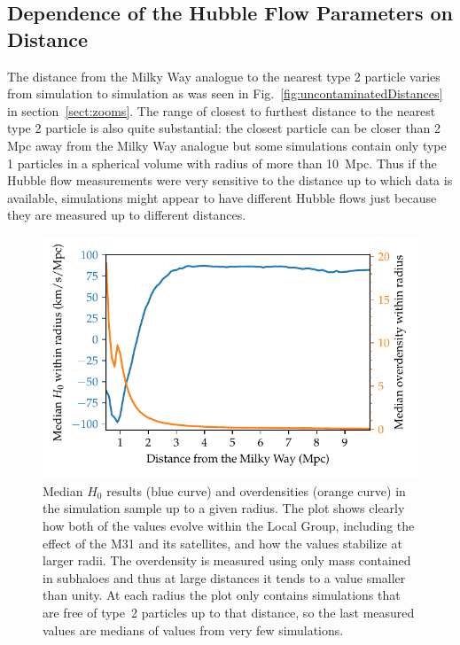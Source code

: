 \documentclass[english, twoside]{HYgradu}
\begin{document}
\subsection{Dependence of the Hubble Flow Parameters on Distance}
The distance from the Milky Way analogue to the nearest type 2 particle varies from simulation to simulation as was seen in Fig.~\ref{fig:uncontaminatedDistances} in section~\ref{sect:zooms}. The range of closest to furthest distance to the nearest type 2 particle is also quite substantial: the closest particle can be closer than 2 Mpc away from the Milky Way analogue but some simulations contain only type 1 particles in a spherical volume with radius of more than 10~Mpc. Thus if the Hubble flow measurements were very sensitive to the distance up to which data is available, simulations might appear to have different Hubble flows just because they are measured up to different distances.

\begin{figure}
    \centering
    \includegraphics{kuvat/overdensity+H0.pdf}
    \caption{Median $H_0$ results (blue curve) and overdensities (orange curve) in the simulation sample up to a given radius. The plot shows clearly how both of the values evolve within the Local Group, including the effect of the M31 and its satellites, and how the values stabilize at larger radii. The overdensity is measured using only mass contained in subhaloes and thus at large distances it tends to a value smaller than unity. At each radius the plot only contains simulations that are free of type~2 particles up to that distance, so the last measured values are medians of values from very few simulations.}\label{fig:overdensity+H0}
\end{figure}
\end{document}
